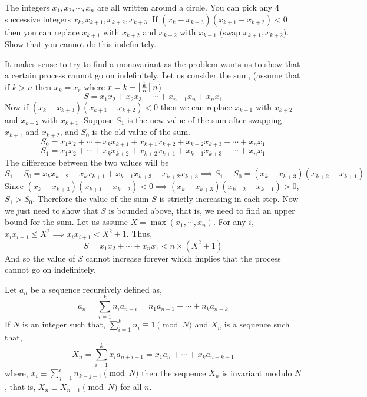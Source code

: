 \documentclass[11pt,numbers=noenddot,svgnames,dvipsnames]{scrartcl}
\begin{document}
\begin{problem}
    The integers $x_{1}, x_{2}, \cdots, x_{n}$ are all written around a circle. 
    You can pick any 4 successive integers $x_{k}, x_{k+1}, x_{k+2}, x_{k+3}$. 
    If $(x_{k} - x_{k+3})(x_{k+1} - x_{k+2}) < 0$ then 
    you can replace $x_{k+1}$ with $x_{k+2}$ and $x_{k+2}$ with $x_{k+1}$ (swap $x_{k+1},x_{k+2}$). 
    Show that you cannot do this indefinitely.
\end{problem}
\begin{sol}
    It makes sense to try to find a monovariant as the problem wants us to 
    show that a certain process cannot go on indefinitely. Let us consider 
    the sum, 
    (assume that if $k > n$ then $x_{k} = x_{r}$ where $r = k - \left\lfloor \frac{k}{n} \right\rfloor n$)
    \[
        S = x_{1}x_{2} + x_{2}x_{3} + \cdots + x_{n-1}x_{n} + x_{n}x_{1}
    \]
    Now if $(x_{k} - x_{k+3})(x_{k+1} - x_{k+2}) < 0$ then we can replace 
    $x_{k+1}$ with $x_{k+2}$ and $x_{k+2}$ with $x_{k+1}$. Suppose $S_{1}$ 
    is the new value of the sum after swapping $x_{k+1}$ and $x_{k+2}$, and $S_{0}$ 
    is the old value of the sum.
    \[
        S_{0} = x_{1}x_{2} + \cdots + x_{k}x_{k+1} + x_{k+1}x_{k+2} + x_{k+2}x_{k+3} + \cdots + x_{n}x_{1}
    \]
    \[
        S_{1} = x_{1}x_{2} + \cdots + x_{k}x_{k+2} + x_{k+2}x_{k+1} + x_{k+1}x_{k+3} + \cdots + x_{n}x_{1}
    \]
    The difference between the two values will be 
    \[
        S_{1} - S_{0} = x_{k}x_{k+2} - x_{k}x_{k+1} + x_{k+1}x_{k+3} - x_{k+2}x_{k+3} 
        \implies S_{1} - S_{0} = (x_{k} - x_{k+3})(x_{k+2} - x_{k+1})
    \]
    Since $(x_{k} - x_{k+3})(x_{k+1} - x_{k+2}) < 0 \implies (x_{k} - x_{k+3})(x_{k+2} - x_{k+1}) > 0$, 
    $S_{1} > S_{0}$. Therefore the value of the sum $S$ is strictly increasing in each step. 
    Now we just need to show that $S$ is bounded above, that is, we need to find an upper bound 
    for the sum. Let us assume $X = \max(x_{1}, \cdots, x_{n})$. 
    For any $i$, $x_{i}x_{i+1} \leq X^{2} \implies x_{i}x_{i+1} < X^{2} + 1$. Thus,
    \[
        S = x_{1}x_{2} + \cdots + x_{n}x_{1} < n \times (X^{2} + 1)
    \]
    And so the value of $S$ cannot increase forever which implies that the process cannot go on indefinitely.
\end{sol}
\begin{proposition}
    Let $a_{n}$ be a sequence recursively defined as,
    \[
        a_{n} = \sum_{i=1}^{k} n_{i} a_{n-i} = n_{1} a_{n-1} + \cdots + n_{k} a_{n-k}
    \]
    If $N$ is an integer such that, $\sum_{i=1}^{k} n_{i} \equiv 1 \pmod{N}$ and 
    $X_{n}$ is a sequence such that,
    \[
        X_{n} = \sum_{i=1}^{k} x_{i} a_{n+i-1} = x_{1} a_{n} + \cdots + x_{k} a_{n+k-1}
    \]
    where, $x_{i} \equiv \sum_{j=1}^{i} n_{k-j+1} \pmod{N}$ then the sequence 
    $X_{n}$ is invariant modulo $N$, that is, $X_{n} \equiv X_{n-1} \pmod{N}$ 
    for all $n$.
\end{proposition}
\end{document}
